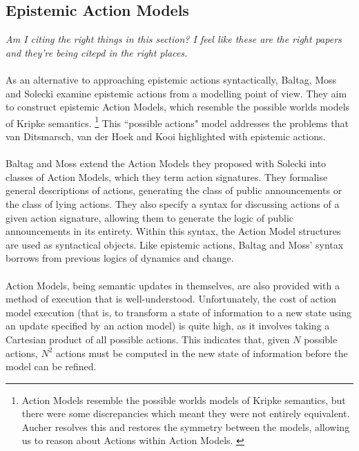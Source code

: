 \documentclass[12pt, a4paper, twoside]{article}
\begin{document}
\subsection{Epistemic Action Models} \label{act_mods}
{\em Am I citing the right things in this section? I feel like these are the
	right papers and they're being citepd in the right places.}\\
\\
As an alternative to approaching epistemic actions syntactically, Baltag, Moss
and Solecki examine epistemic actions from a modelling point of view.
They aim to construct epistemic Action Models, which resemble the possible
worlds models of Kripke semantics. \citep{baltag1998lpa}
\footnote{Action Models resemble the possible worlds models of Kripke semantics,
but there were some discrepancies which meant they were not entirely equivalent.
Aucher resolves this and restores the symmetry between the models, allowing us
to reason about Actions within Action Models. \citep{aucher09revisited}}
This ``possible actions" model addresses the problems that van Ditsmarsch, van
der Hoek and Kooi highlighted with epistemic actions.\\
\\
Baltag and Moss extend the Action Models they proposed with Solecki into classes
of Action Models, which they term action signatures. \citep{baltag2005programs}
They formalise general descriptions of actions, generating the class of
public announcements or the class of lying actions.
They also specify a syntax for discussing actions of a given action signature,
allowing them to generate the logic of public announcements in its entirety.
Within this syntax, the Action Model structures are used as syntactical objects.
Like epistemic actions, Baltag and Moss' syntax borrows from previous logics of
dynamics and change.\\
\\
Action Models, being semantic updates in themselves, are also provided with a
method of execution that is well-understood.
Unfortunately, the cost of action model execution (that is, to transform a state
of information to a new state using an update specified by an action model) is
quite high, as it involves taking a Cartesian product of all possible actions.
This indicates that, given $N$ possible actions, $N^2$ actions must be computed
in the new state of information before the model can be refined.
\end{document}
